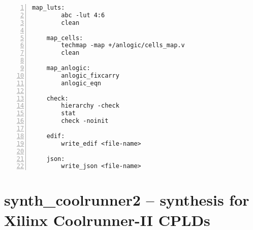 \begin{lstlisting}[numbers=left,frame=single]
    map_luts:
        abc -lut 4:6
        clean

    map_cells:
        techmap -map +/anlogic/cells_map.v
        clean

    map_anlogic:
        anlogic_fixcarry
        anlogic_eqn

    check:
        hierarchy -check
        stat
        check -noinit

    edif:
        write_edif <file-name>

    json:
        write_json <file-name>
\end{lstlisting}

\section{synth\_coolrunner2 -- synthesis for Xilinx Coolrunner-II CPLDs}
\label{cmd:synth_coolrunner2}
